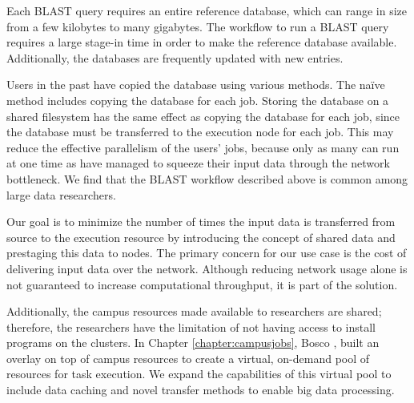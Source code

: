 Each BLAST query requires an entire reference database, which can range in size from a few kilobytes to many gigabytes.  The workflow to run a BLAST query requires a large stage-in time in order to make the reference database available.  Additionally, the databases are frequently updated with new entries.

Users in the past have copied the database using various methods.  The na\"{i}ve method includes copying the database for each job.  Storing the database on a shared filesystem has the same effect as copying the database for each job, since the database must be transferred to the execution node for each job.  This may reduce the effective parallelism of the users' jobs, because only as many can run at one time as have managed to squeeze their input data through the network bottleneck.  We find that the BLAST workflow described above is common among large data researchers.

Our goal is to minimize the number of times the input data is transferred from source to the execution resource by introducing the concept of shared data and prestaging this data to nodes.  The primary concern for our use case is the cost of delivering input data over the network.  Although reducing network usage alone is not guaranteed to increase computational throughput, it is part of the solution.







Additionally, the campus resources made available to researchers are shared; therefore, the researchers have the limitation of not having access to install programs on the clusters.  In Chapter \ref{chapter:campusjobs}, Bosco \cite{weitzel2014accessing}, built an overlay on top of campus resources to create a virtual, on-demand pool of resources for task execution.  We expand the capabilities of this virtual pool to include data caching and novel transfer methods to enable big data processing.



